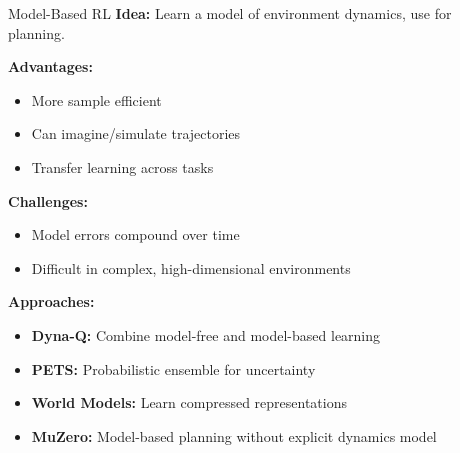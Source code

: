 \documentclass[aspectratio=169]{beamer}
\begin{document}
\begin{frame}{Model-Based RL}
  \textbf{Idea:} Learn a model of environment dynamics, use for planning.

  \vspace{0.5em}

  \textbf{Advantages:}
  \begin{itemize}
    \item More sample efficient
    \item Can imagine/simulate trajectories
    \item Transfer learning across tasks
  \end{itemize}

  \vspace{0.5em}

  \textbf{Challenges:}
  \begin{itemize}
    \item Model errors compound over time
    \item Difficult in complex, high-dimensional environments
  \end{itemize}

  \vspace{0.5em}

  \textbf{Approaches:}
  \begin{itemize}
    \item \textbf{Dyna-Q:} Combine model-free and model-based learning
    \item \textbf{PETS:} Probabilistic ensemble for uncertainty
    \item \textbf{World Models:} Learn compressed representations
    \item \textbf{MuZero:} Model-based planning without explicit dynamics model
  \end{itemize}
\end{frame}
\end{document}
